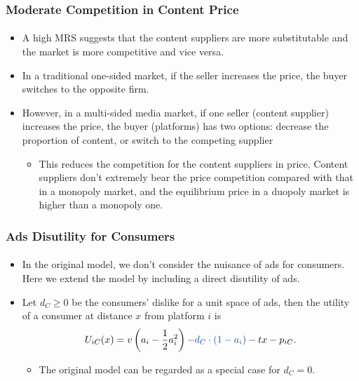 \documentclass{beamer}
\newcommand{\hl}[1]{\textcolor{myblue}{#1}}
\begin{document}
\begin{frame}[label=current]
    \frametitle{Moderate Competition in Content Price}
    \framesubtitle{}
    \begin{itemize}
        \item A high MRS suggests that the content suppliers are more substitutable
            and the market is more competitive and vice versa.
        \item In a traditional one-sided market, if the seller increases the price,
            the buyer switches to the opposite firm.
        \item \hl{However, in a multi-sided media market, if one seller (content supplier)
            increases the price, the buyer (platforms) has two options: decrease the
            proportion of content, or switch to the competing supplier}
            \begin{itemize}
                \item \hl{This reduces the competition for the content suppliers in price.}
                    Content suppliers don't extremely bear the price competition compared with that
                    in a monopoly market, and the equilibrium price in a duopoly market is
                    higher than a monopoly one.
            \end{itemize}
    \end{itemize}
\end{frame}

\begin{frame}[label=current]
    \frametitle{Ads Disutility for Consumers}
    \framesubtitle{}
    \begin{itemize}
        \item In the original model, we don't consider the nuisance of ads for consumers.
            Here we extend the model by including a direct disutility of ads.
        \item Let $d_C\geq0$ be the consumers' dislike for a unit space of ads, then the
            utility of a consumer at distance $x$ from platform $i$ is 
            \[
                U_{iC}(x)=v\left(a_i-\frac{1}{2}a_i^2\right)\hl{-d_C\cdot(1-a_i)}
                -tx-p_{iC}.
            \]
            \begin{itemize}
                \item The original model can be regarded as a special case for $d_C=0$.
            \end{itemize}
    \end{itemize}
\end{frame}
\end{document}
